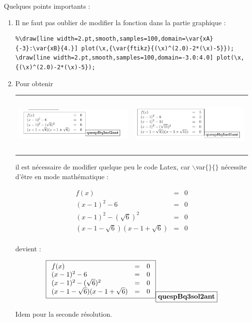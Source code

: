 {\begin{remarque} Quelques points importants : \\
\begin{enumerate}
 \item  Il ne faut pas oublier de modifier la fonction dans la partie graphique : 
 {\small
 \begin{verbatim}
%\draw[line width=2.pt,smooth,samples=100,domain=\var{xA}{-3}:\var{xB}{4.}] plot(\x,{\var{ftikz}{(\x)^(2.0)-2*(\x)-5}});
\draw[line width=2.pt,smooth,samples=100,domain=-3.0:4.0] plot(\x,{(\x)^(2.0)-2*(\x)-5});  
 \end{verbatim}
 }
\item Pour obtenir 
 \begin{center}
 \begin{tabular}{cc}
 \includegraphics[width=8cm,height=3cm]{./images/creation_exercice_var_05a.png}
&
 \includegraphics[width=8cm,height=3cm]{./images/creation_exercice_var_05b.png}
\end{tabular}
il est nécessaire de modifier quelque peu le code Latex, car $\backslash$var$\{\}\{\}$ nécessite d'être en mode mathématique :
\begin{verbatim*}
\begin{eqnarray*}
 f(x) &=& 0 \\
 (x-1)^2 -6  &=&0 \\
 (x-1)^2 -(\sqrt{6})^2  &=&0 \\
 (x-1-\sqrt{6})  (x-1+\sqrt{6}) &=&0 \\
\end{eqnarray*}

\end{verbatim*}
devient : 
\begin{verbatim*}
 $$
\var{quespBq3sol2ant}{
\begin{array}{lll}
 f(x) &=& 0 \\
 (x-1)^2 -6  &=&0 \\
 (x-1)^2 -(\sqrt{6})^2  &=&0 \\
 (x-1-\sqrt{6})  (x-1+\sqrt{6}) &=&0 \\
\end{array}
}
$$
\end{verbatim*}
Idem pour la seconde résolution. 
\end{center}
\end{enumerate}



\end{remarque}}
